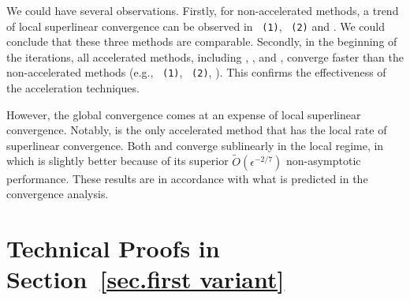 \documentclass{mcom-l}
\numberwithin{equation}{section}
\begin{document}
We could have several observations. Firstly, for non-accelerated methods, a trend of local superlinear convergence can be observed in \utr{}~\texttt{(1)}, \utr{}~\texttt{(2)} and \arc{}. We could conclude that these three methods are comparable.
Secondly, in the beginning of the iterations, all accelerated methods, including \atr{}, \atrms{}, and \arca{}, converge faster than the non-accelerated methods (e.g., \utr{}~\texttt{(1)}, \utr{}~\texttt{(2)}, \arc{}). This confirms the effectiveness of the acceleration techniques.

However, the global convergence comes at an expense of local superlinear convergence.
Notably, \atr{} is the only accelerated method that has the local rate of superlinear convergence.
Both \atrms{} and \arca{} converge sublinearly in the local regime, in which \atrms{} is slightly better because of its superior $\tilde O(\epsilon^{-2/7})$ non-asymptotic performance. These results are in accordance with what is predicted in the convergence analysis.



\clearpage
{}




\clearpage
\appendix
\section{Technical Proofs in Section~\ref{sec.first variant}}\label{sec.proof variant 1}
\end{document}
